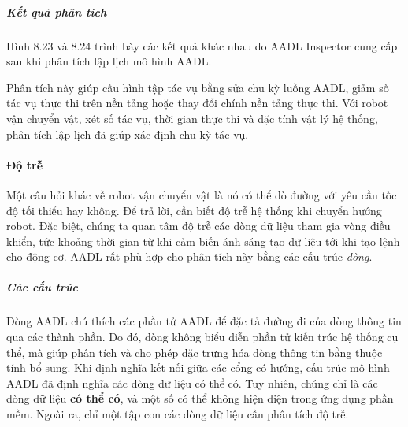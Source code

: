 \subparagraph{Kết quả phân tích}
Hình 8.23 và 8.24 trình bày các kết quả khác nhau do AADL Inspector cung cấp sau khi phân tích lập lịch mô hình AADL.

Phân tích này giúp cấu hình tập tác vụ bằng sửa chu kỳ luồng AADL, giảm số tác vụ thực thi trên nền tảng hoặc thay đổi chính nền tảng thực thi. Với robot vận chuyển vật, xét số tác vụ, thời gian thực thi và đặc tính vật lý hệ thống, phân tích lập lịch đã giúp xác định chu kỳ tác vụ.

\paragraph{Độ trễ}
Một câu hỏi khác về robot vận chuyển vật là nó có thể dò đường với yêu cầu tốc độ tối thiểu hay không. Để trả lời, cần biết độ trễ hệ thống khi chuyển hướng robot. Đặc biệt, chúng ta quan tâm độ trễ các dòng dữ liệu tham gia vòng điều khiển, tức khoảng thời gian từ khi cảm biến ánh sáng tạo dữ liệu tới khi tạo lệnh cho động cơ. AADL rất phù hợp cho phân tích này bằng các cấu trúc \emph{dòng}.

\subparagraph{Các cấu trúc}
Dòng AADL chú thích các phần tử AADL để đặc tả đường đi của dòng thông tin qua các thành phần. Do đó, dòng không biểu diễn phần tử kiến trúc hệ thống cụ thể, mà giúp phân tích và cho phép đặc trưng hóa dòng thông tin bằng thuộc tính bổ sung. Khi định nghĩa kết nối giữa các cổng có hướng, cấu trúc mô hình AADL đã định nghĩa các dòng dữ liệu có thể có. Tuy nhiên, chúng chỉ là các dòng dữ liệu \textbf{có thể có},
và một số có thể không hiện diện trong ứng dụng phần mềm. Ngoài ra, chỉ một tập con các dòng dữ liệu cần phân tích độ trễ.

